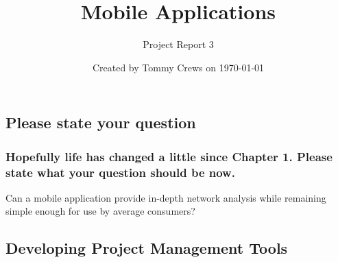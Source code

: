 \documentclass[letterpaper]{article}            %
\title{Mobile Applications}                     %
\author{Project Report 3}                       %
\date{Created by Tommy Crews on \today}         %
\begin{document}
\newcommand{\code}[1]{\texttt{#1}}              %

\setcounter{section}{3}							%

\maketitle                                      %



%
%




\subsection{Please state your question}

\subsubsection{Hopefully life has changed a little since Chapter 1. Please state what your question should be now.}

Can a mobile application provide in-depth network analysis while remaining simple enough for use by average consumers?


\subsection{Developing Project Management Tools}
\end{document}
